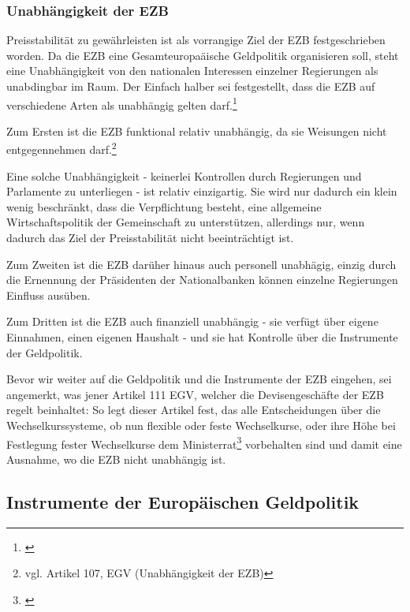 \documentclass[
  onecolumn,
  a4paper,
  abstracton,
  parskip=half
  ,final
  ]{scrartcl}
\begin{document}
\subsubsection{Unabh{\"a}ngigkeit der EZB}

Preisstabilit{\"a}t zu gew{\"a}hrleisten ist als vorrangige Ziel der EZB festgeschrieben worden. Da die EZB eine Gesamteuropa{\"a}ische Geldpolitik organisieren soll, steht eine Unabh{\"a}ngigkeit von den nationalen Interessen einzelner Regierungen als unabdingbar im Raum. Der Einfach halber sei festgestellt, dass die EZB auf verschiedene Arten als unabh{\"a}ngig gelten darf.\footnote[51]{\citep[vgl.][S.555-557]{Basseler2010}} 

Zum Ersten ist die EZB funktional relativ unabh{\"a}ngig, da sie Weisungen nicht entgegennehmen darf.\footnote[34]{vgl. Artikel 107, EGV (Unabh{\"a}ngigkeit der EZB)}

Eine solche Unabh{\"a}ngigkeit - keinerlei Kontrollen durch Regierungen und Parlamente zu unterliegen - ist relativ einzigartig. Sie wird nur dadurch ein klein wenig beschr{\"a}nkt, dass die Verpflichtung besteht, eine allgemeine Wirtschaftspolitik der Gemeinschaft zu unterst{\"u}tzen, allerdings nur, wenn dadurch das Ziel der Preisstabilit{\"a}t nicht beeintr{\"a}chtigt ist.

Zum Zweiten ist die EZB dar{\"u}her hinaus auch personell unabh{\"a}gig, einzig durch die Ernennung der Pr{\"a}sidenten der Nationalbanken k{\"o}nnen einzelne Regierungen Einfluss aus{\"u}ben.

Zum Dritten ist die EZB auch finanziell unabh{\"a}ngig - sie verf{\"u}gt {\"u}ber eigene Einnahmen, einen eigenen Haushalt - und sie hat Kontrolle {\"u}ber die Instrumente der Geldpolitik.


Bevor wir weiter auf die Geldpolitik und die Instrumente der EZB eingehen, sei angemerkt, was jener Artikel 111 EGV, welcher die Devisengesch{\"a}fte der EZB regelt beinhaltet:
So legt dieser Artikel fest, das alle Entscheidungen {\"u}ber die Wechselkurssysteme, ob nun flexible oder feste Wechselkurse, oder ihre H{\"o}he bei Festlegung fester Wechselkurse dem Ministerrat\footnote[52]{\citep[S.555]{Basseler2010}} vorbehalten sind und damit eine Ausnahme, wo die EZB nicht unabh{\"a}ngig ist. 

\subsection{Instrumente der Europ{\"a}ischen Geldpolitik}
\end{document}
